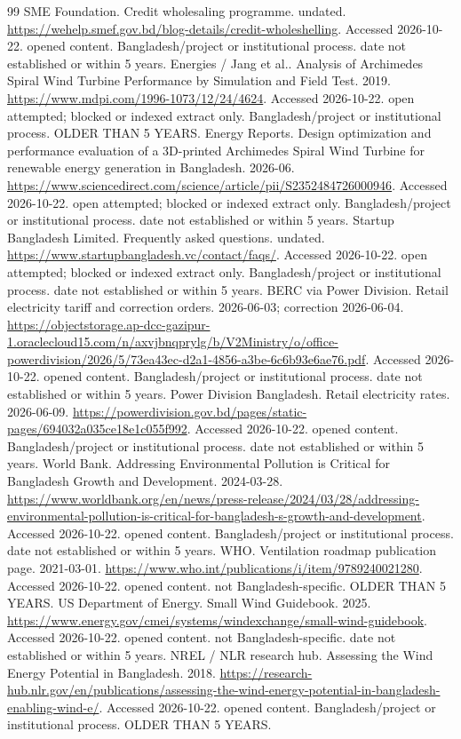 \documentclass[11pt,a4paper]{article}
\begin{document}
\begin{thebibliography}{99}
 SME Foundation. Credit wholesaling programme. undated. \url{https://wehelp.smef.gov.bd/blog-details/credit-wholeshelling}. Accessed 2026-10-22. opened content. Bangladesh/project or institutional process. date not established or within 5 years.
 Energies / Jang et al.. Analysis of Archimedes Spiral Wind Turbine Performance by Simulation and Field Test. 2019. \url{https://www.mdpi.com/1996-1073/12/24/4624}. Accessed 2026-10-22. open attempted; blocked or indexed extract only. Bangladesh/project or institutional process. OLDER THAN 5 YEARS.
 Energy Reports. Design optimization and performance evaluation of a 3D-printed Archimedes Spiral Wind Turbine for renewable energy generation in Bangladesh. 2026-06. \url{https://www.sciencedirect.com/science/article/pii/S2352484726000946}. Accessed 2026-10-22. open attempted; blocked or indexed extract only. Bangladesh/project or institutional process. date not established or within 5 years.
 Startup Bangladesh Limited. Frequently asked questions. undated. \url{https://www.startupbangladesh.vc/contact/faqs/}. Accessed 2026-10-22. open attempted; blocked or indexed extract only. Bangladesh/project or institutional process. date not established or within 5 years.
 BERC via Power Division. Retail electricity tariff and correction orders. 2026-06-03; correction 2026-06-04. \url{https://objectstorage.ap-dcc-gazipur-1.oraclecloud15.com/n/axvjbnqprylg/b/V2Ministry/o/office-powerdivision/2026/5/73ea43ec-d2a1-4856-a3be-6c6b93e6ae76.pdf}. Accessed 2026-10-22. opened content. Bangladesh/project or institutional process. date not established or within 5 years.
 Power Division Bangladesh. Retail electricity rates. 2026-06-09. \url{https://powerdivision.gov.bd/pages/static-pages/694032a035ce18e1c055f992}. Accessed 2026-10-22. opened content. Bangladesh/project or institutional process. date not established or within 5 years.
 World Bank. Addressing Environmental Pollution is Critical for Bangladesh Growth and Development. 2024-03-28. \url{https://www.worldbank.org/en/news/press-release/2024/03/28/addressing-environmental-pollution-is-critical-for-bangladesh-s-growth-and-development}. Accessed 2026-10-22. opened content. Bangladesh/project or institutional process. date not established or within 5 years.
 WHO. Ventilation roadmap publication page. 2021-03-01. \url{https://www.who.int/publications/i/item/9789240021280}. Accessed 2026-10-22. opened content. not Bangladesh-specific. OLDER THAN 5 YEARS.
 US Department of Energy. Small Wind Guidebook. 2025. \url{https://www.energy.gov/cmei/systems/windexchange/small-wind-guidebook}. Accessed 2026-10-22. opened content. not Bangladesh-specific. date not established or within 5 years.
 NREL / NLR research hub. Assessing the Wind Energy Potential in Bangladesh. 2018. \url{https://research-hub.nlr.gov/en/publications/assessing-the-wind-energy-potential-in-bangladesh-enabling-wind-e/}. Accessed 2026-10-22. opened content. Bangladesh/project or institutional process. OLDER THAN 5 YEARS.
\end{thebibliography}
\end{document}
